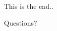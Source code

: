 \documentclass{beamer}
\begin{document}
%			
%
%

	\begin{frame}{This is the end..}
	\begin{alertblock}{}
		\center
		Questions?
	\end{alertblock}
	\end{frame} 	
 	

{} 	
 	
\end{document}
